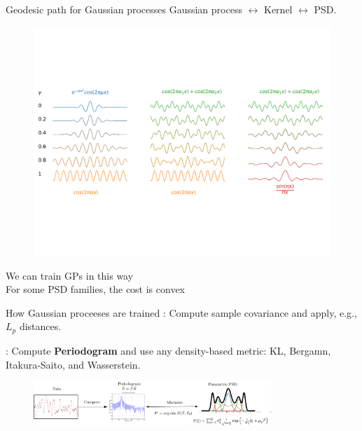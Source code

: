 \documentclass[pdf,aspectratio=169,10pt]{beamer}
\begin{document}
\begin{frame}{Geodesic path for Gaussian processes}
Gaussian process $\leftrightarrow$ Kernel $\leftrightarrow$ PSD.
\begin{figure}
\includegraphics[trim={0 150 0 150},clip,width=1\textwidth]{../img/sinc_gaus_sin2.pdf}
\end{figure}
\centering
{} We can train GPs in this way\\
 For some PSD families, the cost is convex
\end{frame}

\begin{frame}[plain]{How Gaussian proceeses are trained}
    \noindent{}: Compute sample covariance and apply, e.g., $L_p$ distances. 
    \begin{figure} 
            \centering
        \end{figure}

     \noindent{}: Compute \textbf{Periodogram} and use any density-based metric: KL, Bergamn, Itakura-Saito, and Wasserstein. 
    
        \begin{figure} 
            \centering
            \includegraphics[width=0.8\textwidth]{../img/spectral_metric_diag.pdf}
        \end{figure}


\end{frame}
\end{document}
